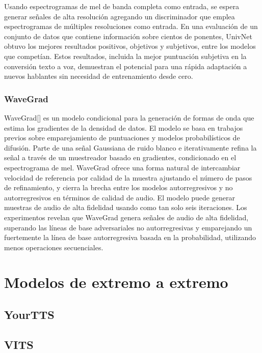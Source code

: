 Usando espectrogramas de mel de banda completa como entrada, se espera generar señales de alta resolución agregando un discriminador que emplea espectrogramas de múltiples resoluciones como entrada. En una evaluación de un conjunto de datos que contiene información sobre cientos de ponentes, UnivNet obtuvo los mejores resultados positivos, objetivos y subjetivos,  entre los modelos que competían. Estos resultados, incluida la mejor puntuación subjetiva en la conversión texto a voz, demuestran el potencial para una rápida adaptación a nuevos hablantes sin necesidad de entrenamiento desde cero.

\subsubsection{WaveGrad}

WaveGrad[\cite{chen2020wavegrad}] es un modelo condicional para la generación de formas de onda que estima los gradientes de la densidad de datos. El modelo se basa en trabajos previos sobre emparejamiento de puntuaciones y modelos probabilísticos de difusión. Parte de una señal Gaussiana de ruido blanco e iterativamente refina la señal a través de un muestreador basado en gradientes, condicionado en el espectrograma de mel. WaveGrad ofrece una forma natural de intercambiar velocidad de referencia por calidad de la muestra ajustando el número de pasos de refinamiento, y cierra la brecha entre los modelos autorregresivos y no autorregresivos en términos de calidad de audio. El modelo puede generar muestras de audio de alta fidelidad usando como tan solo seis iteraciones. Los experimentos revelan que WaveGrad genera señales de audio de alta fidelidad, superando las líneas de base adversariales no autorregresivas y emparejando un fuertemente la línea de base autorregresiva basada en la probabilidad, utilizando menos operaciones secuenciales.


\section{Modelos de extremo a extremo}

\subsection{YourTTS}

\subsection{VITS}

